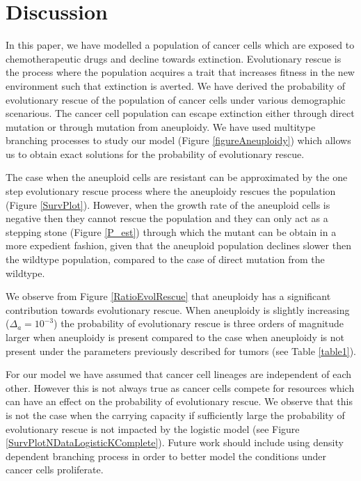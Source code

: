 \documentclass[12pt]{extarticle}
\begin{document}


\newpage
\section*{Discussion}

In this paper, we have modelled a population of cancer cells which are exposed to chemotherapeutic drugs and decline towards extinction. Evolutionary rescue  is the process where the population acquires a trait that increases fitness in the new environment such that extinction is averted. We have derived the probability of evolutionary rescue of the population of cancer cells under various demographic scenarious. The cancer cell population can escape extinction either through direct mutation or through mutation from aneuploidy. We have used multitype branching processes to study our model (Figure \ref{figureAneuploidy}) which allows us to obtain exact solutions for the probability of evolutionary rescue.

The case when the aneuploid cells are resistant can be approximated by the one step evolutionary rescue process where the aneuploidy rescues the population (Figure \ref{SurvPlot}). However, when the growth rate of the aneuploid cells is negative then they cannot rescue the population and they can only act as a stepping stone (Figure \ref{P_est}) through which the mutant can be obtain in a more expedient fashion, given that the aneuploid population declines slower then the wildtype population, compared to the case of direct mutation from the wildtype. 

We observe from Figure \ref{RatioEvolRescue} that aneuploidy has a significant contribution towards evolutionary rescue. When aneuploidy is slightly increasing ($\Delta_a=10^{-3}$) the probability of evolutionary rescue is three orders of magnitude larger when aneuploidy is present compared to the case when aneuploidy is not present under the parameters previously described for tumors (see Table \ref{table1}).

For our model we have assumed that cancer cell lineages are independent of each other. However this is not always true as cancer cells compete for resources which can have an effect on the probability of evolutionary rescue. We observe that this is not the case when the carrying capacity if sufficiently large the probability of evolutionary rescue is not impacted by the logistic model (see Figure \ref{SurvPlotNDataLogisticKComplete}). Future work should include using density dependent branching process in order to better model the conditions under cancer cells proliferate.
\end{document}
